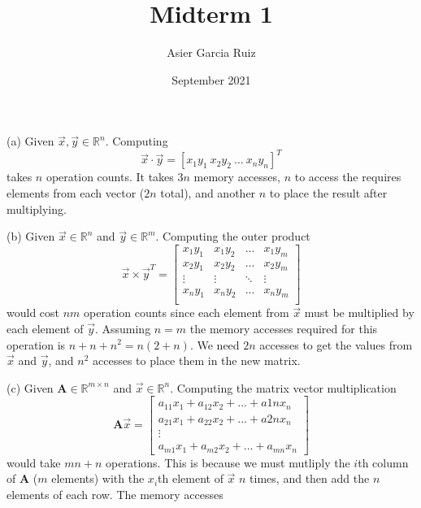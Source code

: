\documentclass{article}
\title{Midterm 1}
\author{Asier Garcia Ruiz }
\date{September 2021}
\newcommand{\R}{\mathbb{R}}
\begin{document}
\maketitle

\section{}

\section{}

\section{}
 (a) Given $\vec{x}, \vec{y} \in \R^n$. Computing
$$\vec{x} \cdot \vec{y} = [x_1y_1 \ x_2y_2 \ ... \ x_ny_n]^T$$
takes $n$ operation counts. It takes $3n$ memory accesses, $n$ to access
the requires elements from each vector ($2n$ total), and another $n$
to place the result after multiplying.

(b) Given $\vec{x} \in \R^n$ and $\vec{y} \in \R^m$. Computing the outer product
$$\vec{x} \times \vec{y}^T =
    \begin{bmatrix}
        x_1y_1 & x_1y_2 & ...    & x_1y_m \\
        x_2y_1 & x_2y_2 & ...    & x_2y_m \\
        \vdots & \vdots & \ddots & \vdots \\
        x_ny_1 & x_ny_2 & ...    & x_ny_m \\
    \end{bmatrix} $$
would cost $nm$ operation counts since each element from $\vec{x}$ must be
multiplied by each element of $\vec{y}$. Assuming $n=m$ the memory accesses
required for this operation is $n + n + n^2 = n(2 + n)$. We need $2n$ accesses
to get the values from $\vec{x}$ and $\vec{y}$, and $n^2$ accesses to place them
in the new matrix.

(c) Given $\bm{A} \in \R^{m\times n}$ and $\vec{x} \in \R^n$. Computing the
matrix vector multiplication
$$\bm{A}\vec{x} = \begin{bmatrix}
        a_{11}x_1 + a_{12}x_2 + ...    + a{1n}x_n \\
        a_{21}x_1 + a_{22}x_2 + ...    + a{2n}x_n \\
        \vdots                                    \\
        a_{m1}x_1 + a_{m2}x_2 + ...    + a_{mn}x_n
    \end{bmatrix}$$
would take $mn + n$ operations. This
is because we must mutliply the $i$th column of $\bm{A}$ ($m$ elements) with the
$x_i$th element of $\vec{x}$ $n$ times, and then add the $n$ elements of each row.
The memory accesses
\end{document}
